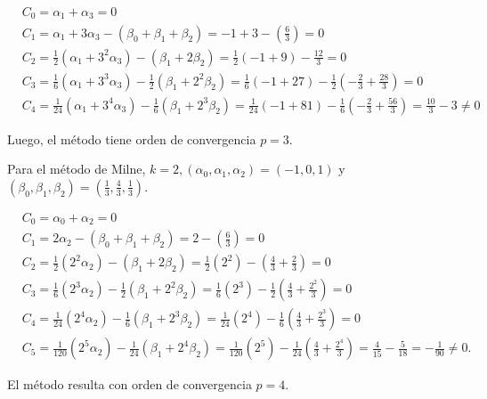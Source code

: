 \documentclass[10pt]{article}
\begin{document}
$$
\begin{aligned}
& C_{0}=\alpha_{1}+\alpha_{3}=0 \\
& C_{1}=\alpha_{1}+3 \alpha_{3}-\left(\beta_{0}+\beta_{1}+\beta_{2}\right)=-1+3-\left(\frac{6}{3}\right)=0 \\
& C_{2}=\frac{1}{2}\left(\alpha_{1}+3^{2} \alpha_{3}\right)-\left(\beta_{1}+2 \beta_{2}\right)=\frac{1}{2}(-1+9)-\frac{12}{3}=0 \\
& C_{3}=\frac{1}{6}\left(\alpha_{1}+3^{3} \alpha_{3}\right)-\frac{1}{2}\left(\beta_{1}+2^{2} \beta_{2}\right)=\frac{1}{6}(-1+27)-\frac{1}{2}\left(-\frac{2}{3}+\frac{28}{3}\right)=0 \\
& C_{4}=\frac{1}{24}\left(\alpha_{1}+3^{4} \alpha_{3}\right)-\frac{1}{6}\left(\beta_{1}+2^{3} \beta_{2}\right)=\frac{1}{24}(-1+81)-\frac{1}{6}\left(-\frac{2}{3}+\frac{56}{3}\right)=\frac{10}{3}-3 \neq 0
\end{aligned}
$$

Luego, el método tiene orden de convergencia $p=3$.

Para el método de Milne, $k=2,\left(\alpha_{0}, \alpha_{1}, \alpha_{2}\right)=(-1,0,1)$ y $\left(\beta_{0}, \beta_{1}, \beta_{2}\right)=\left(\frac{1}{3}, \frac{4}{3}, \frac{1}{3}\right)$.

$$
\begin{aligned}
& C_{0}=\alpha_{0}+\alpha_{2}=0 \\
& C_{1}=2 \alpha_{2}-\left(\beta_{0}+\beta_{1}+\beta_{2}\right)=2-\left(\frac{6}{3}\right)=0 \\
& C_{2}=\frac{1}{2}\left(2^{2} \alpha_{2}\right)-\left(\beta_{1}+2 \beta_{2}\right)=\frac{1}{2}\left(2^{2}\right)-\left(\frac{4}{3}+\frac{2}{3}\right)=0 \\
& C_{3}=\frac{1}{6}\left(2^{3} \alpha_{2}\right)-\frac{1}{2}\left(\beta_{1}+2^{2} \beta_{2}\right)=\frac{1}{6}\left(2^{3}\right)-\frac{1}{2}\left(\frac{4}{3}+\frac{2^{2}}{3}\right)=0 \\
& C_{4}=\frac{1}{24}\left(2^{4} \alpha_{2}\right)-\frac{1}{6}\left(\beta_{1}+2^{3} \beta_{2}\right)=\frac{1}{24}\left(2^{4}\right)-\frac{1}{6}\left(\frac{4}{3}+\frac{2^{3}}{3}\right)=0 \\
& C_{5}=\frac{1}{120}\left(2^{5} \alpha_{2}\right)-\frac{1}{24}\left(\beta_{1}+2^{4} \beta_{2}\right)=\frac{1}{120}\left(2^{5}\right)-\frac{1}{24}\left(\frac{4}{3}+\frac{2^{4}}{3}\right)=\frac{4}{15}-\frac{5}{18}=-\frac{1}{90} \neq 0 .
\end{aligned}
$$

El método resulta con orden de convergencia $p=4$.
\end{document}
